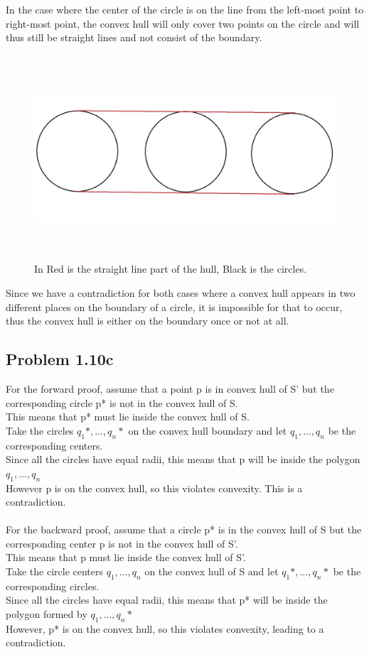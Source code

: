 \documentclass[11pt,psfig]{article}
\begin{document}
In the case where the center of the circle is on the line from the left-most point to right-most point, the convex hull will only cover two points on the circle and will thus still be straight lines and not consist of the boundary.
\begin{figure}[H]
\centering
\includegraphics[height=3in]{hw1prob1-10b_2.jpg}
\caption{In Red is the straight line part of the hull, Black is the circles.}
\end{figure}
Since we have a contradiction for both cases where a convex hull appears in two different places on the boundary of a circle, it is impossible for that to occur, thus the convex hull is either on the boundary once or not at all. 

\subsection*{Problem 1.10c}

For the forward proof, assume that a point p is in convex hull of S' but the corresponding circle p* is not in the convex hull of S. 
\\This means that p* must lie inside the convex hull of S. 
\\Take the circles $q_1*,...,q_n*$ on the convex hull boundary and let $q_1,...,q_n$ be the corresponding centers. 
\\Since all the circles have equal radii, this means that p will be inside the polygon $q_1,...,q_n$ \\
However p is on the convex hull, so this violates convexity. This is a contradiction.\\
\\
For the backward proof, assume that a circle p* is in the convex hull of S but the corresponding center p is not in the convex hull of S'. \\
This means that p must lie inside the convex hull of S'.
\\Take the circle centers $q_1,...,q_n$ on the convex hull of S and let $q_1*,...,q_n*$ be the corresponding circles.
\\Since all the circles have equal radii, this means that p* will be inside the polygon formed by $q_1,...,q_n*$\\
However, p* is on the convex hull, so this violates convexity, leading to a contradiction. 
\end{document}
